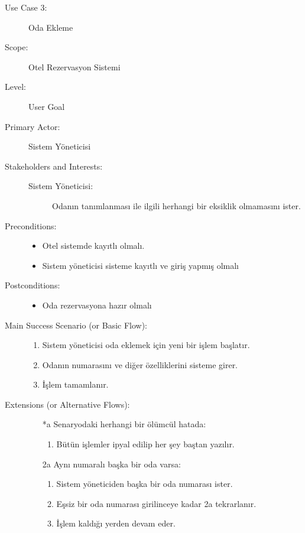 \documentclass[12pt,a4paper]{report}
\begin{document}
\newpage
\begin{description}
\item[Use Case 3:] Oda Ekleme \\
\item[Scope:] Otel Rezervasyon Sistemi
\item[Level:] User Goal
\item[Primary Actor:] Sistem Yöneticisi 
\item[Stakeholders and Interests:] \hspace{10 mm}
\begin{description} 
\item[Sistem Yöneticisi:] Odanın tanımlanması ile ilgili herhangi bir eksiklik olmamasını ister.
\end{description}
\item[Preconditions:] \hspace{10mm}
\begin{itemize}
\item Otel sistemde kayıtlı olmalı.
\item Sistem yöneticisi sisteme kayıtlı ve giriş yapmış olmalı
\end{itemize}

\item[Postconditions:] \hspace{10mm}
\begin{itemize}
\item Oda rezervasyona hazır olmalı
\end{itemize}
\item[Main Success Scenario (or Basic Flow):] \hspace{10mm}
\begin{enumerate}
\item Sistem yöneticisi oda eklemek için yeni bir işlem başlatır.
\item Odanın numarasını ve diğer özelliklerini sisteme girer.
\item İşlem tamamlanır.
\end{enumerate}
\item[Extensions (or Alternative Flows):] \hspace{10mm}
\begin{itemize}
\item[*a] Senaryodaki herhangi bir ölümcül hatada:
    \begin{enumerate}
    \item Bütün işlemler ipyal edilip her şey baştan yazılır.
    \end{enumerate}
\item[2a] Aynı numaralı başka bir oda varsa:
    \begin{enumerate}
    \item Sistem yöneticiden başka bir oda numarası ister.
    \item Eşsiz bir oda numarası girilinceye kadar 2a tekrarlanır.
    \item İşlem kaldığı yerden devam eder.
    \end{enumerate}
\end{itemize}
\end{description}
\end{document}
